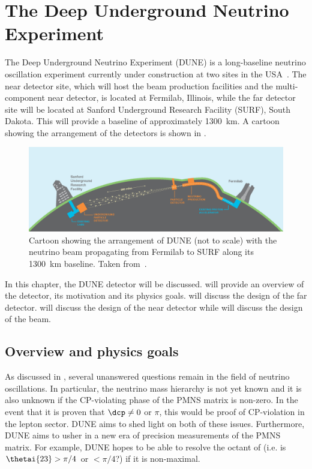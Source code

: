 \chapter{The Deep Underground Neutrino Experiment}
\label{sec:dune}

The Deep Underground Neutrino Experiment (DUNE) is a long-baseline neutrino oscillation experiment currently under construction at two sites in the USA~\cite{tdrVol1, tdrVol2, tdrVol3, tdrVol4}.
The near detector site, which will host the beam production facilities and the multi-component near detector, is located at Fermilab, Illinois, while the far detector site will be located at Sanford Underground Research Facility (SURF), South Dakota.
This will provide a baseline of approximately \SI{1300}{\km}.
A cartoon showing the arrangement of the detectors is shown in .

\begin{figure}[h]
  \centering
  \includegraphics[width=.9\linewidth]{files/figures/dune_detector/duneCartoon}
  \caption[Cartoon of DUNE.]{Cartoon showing the arrangement of DUNE (not to scale) with the neutrino beam propagating from Fermilab to SURF along its 1300~km baseline. Taken from~\cite{tdrVol1}.}
  \label{fig:duneCartoon}
\end{figure}

In this chapter, the DUNE detector will be discussed.
 will provide an overview of the detector, its motivation and its physics goals.
 will discuss the design of the far detector.
 will discuss the design of the near detector while  will discuss the design of the beam.

\section{Overview and physics goals}
\label{sec:dune:overview}
As discussed in , several unanswered questions remain in the field of neutrino oscillations.
In particular, the neutrino mass hierarchy is not yet known and it is also unknown if the CP-violating phase of the PMNS matrix is non-zero.
In the event that it is proven that $\dcp \neq 0$ or $\pi$, this would be proof of CP-violation in the lepton sector.
DUNE aims to shed light on both of these issues.
Furthermore, DUNE aims to usher in a new era of precision measurements of the PMNS matrix. 
For example, DUNE hopes to be able to resolve the octant of  (i.e. is $\thetai{23} > \pi/4$ or $< \pi/4$?) if it is non-maximal. 

